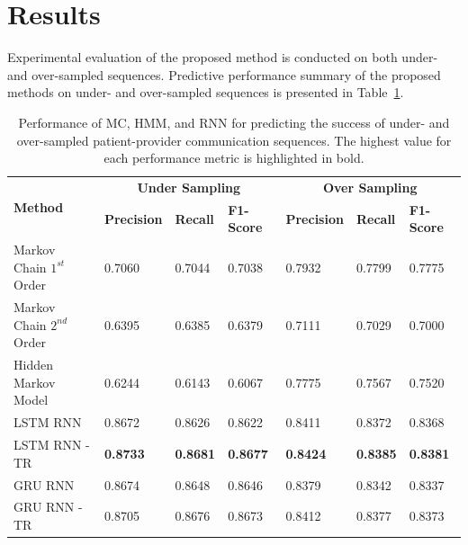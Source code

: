 \documentclass{amia_summit_2018}
\begin{document}
\section*{Results}
Experimental evaluation of the proposed method is conducted on both under- and over-sampled sequences. Predictive performance summary of the proposed methods on under- and over-sampled sequences is presented in Table~\ref{tab:result_under_over_sampled}. 
\begin{table}[h]
\centering
\caption{Performance of MC, HMM, and RNN for predicting the success of under- and over-sampled patient-provider communication sequences. The highest value for each performance metric is highlighted in bold.}
\label{tab:result_under_over_sampled}
  \begin{tabular}{|l|l|l|l|l|l|l|}
  \hline
   \multirow{2}{*}{\textbf{Method}} & \multicolumn{3}{|c|}{\textbf{Under Sampling}} & \multicolumn{3}{|c|}{\textbf{Over Sampling}} \\\cline{2-7}
   & \textbf{Precision}  & \textbf{Recall} & \textbf{F1-Score} & \textbf{Precision}  & \textbf{Recall} & \textbf{F1-Score}\\ \hline    
    
 Markov Chain $1^{st}$ Order & 0.7060 & 0.7044 & 0.7038 & 0.7932 & 0.7799 & 0.7775 \\ \hline
 Markov Chain $2^{nd}$ Order & 0.6395 & 0.6385 & 0.6379 & 0.7111 & 0.7029 & 0.7000\\ \hline
 Hidden Markov Model & 0.6244 & 0.6143 & 0.6067 & 0.7775 & 0.7567 & 0.7520\\ \hline
 LSTM RNN & 0.8672 & 0.8626 & 0.8622 & 0.8411 & 0.8372 & 0.8368\\ \hline
 LSTM RNN - TR & \textbf{0.8733} & \textbf{0.8681} & \textbf{0.8677} & \textbf{0.8424} & \textbf{0.8385} & \textbf{0.8381}\\ \hline
 GRU RNN & 0.8674 & 0.8648 & 0.8646 & 0.8379 & 0.8342 & 0.8337\\ \hline
 GRU RNN - TR & 0.8705 & 0.8676 & 0.8673 & 0.8412 & 0.8377 & 0.8373\\ \hline 
  \end{tabular}
\end{table}  
\end{document}
